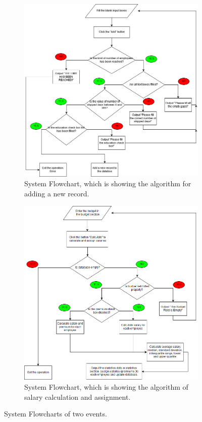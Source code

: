 \documentclass[a4]{article}
\begin{document}
\begin{figure}[ht]
  \centering
  \begin{subfigure}[b]{0.7\linewidth}
    \includegraphics[width=\linewidth]{box.png}
    \caption{System Flowchart, which is showing the algorithm for adding a new record.}
    \label{subf:add}
  \end{subfigure}
  \begin{subfigure}[b]{0.7\linewidth}
    \includegraphics[width=\linewidth]{box2.png}
    \caption{System Flowchart, which is showing the algorithm of salary calculation and assignment.}
    \label{subf:calc}
  \end{subfigure}
  \caption{System Flowcharts of two events.}
  \label{fig:coffee}
\end{figure}
\end{document}
